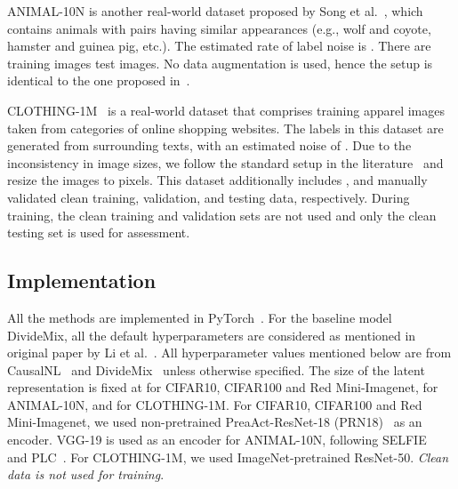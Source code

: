 \documentclass[10pt,twocolumn,letterpaper]{article}
\begin{document}
    ANIMAL-10N is another real-world dataset proposed by Song et al.~\cite{song2019selfie}, which contains  animals with  pairs having similar appearances (e.g., wolf and coyote, hamster and guinea pig, etc.). The estimated rate of label noise is . There are  training images   test images. No data augmentation is used, hence the setup is identical to the one proposed in~\cite{song2019selfie}. 
    
    CLOTHING-1M~\cite{xiao2015learning} is a real-world dataset that comprises  training apparel images taken from  categories of online shopping websites. The labels in this dataset are generated from surrounding texts, with an estimated noise of . Due to the inconsistency in image sizes, we follow the standard setup in the literature~\cite{han2019deep, li2020dividemix, cordeiro2021propmix} and resize the images to  pixels. This dataset additionally includes , and  manually validated clean training, validation, and testing data, respectively. During training, the clean training and validation sets are not used and only the clean testing set is used for assessment.
    


    
    \subsection{Implementation}\label{subsec:implementation}
    
    
All the methods are implemented in PyTorch~\cite{paszke2019pytorch}. For the baseline model DivideMix, all the default hyperparameters are considered as mentioned in original paper by Li et al.~\cite{li2020dividemix}.
    All hyperparameter values mentioned below are from CausalNL~\cite{yao2021instance} and DivideMix~\cite{li2020dividemix} unless otherwise specified.
    The size of the latent representation  is fixed at  for CIFAR10, CIFAR100 and Red Mini-Imagenet,  for ANIMAL-10N, and  for CLOTHING-1M. 
    For CIFAR10, CIFAR100 and Red Mini-Imagenet, we used non-pretrained PreaAct-ResNet-18 (PRN18)~\cite{he2016identity} as an encoder. 
    VGG-19 is used as an encoder for ANIMAL-10N, following SELFIE~\cite{song2019selfie} and PLC~\cite{zhang2021learning}. For CLOTHING-1M, we used ImageNet-pretrained ResNet-50. \textit{Clean data is not used for training}. 
\end{document}
